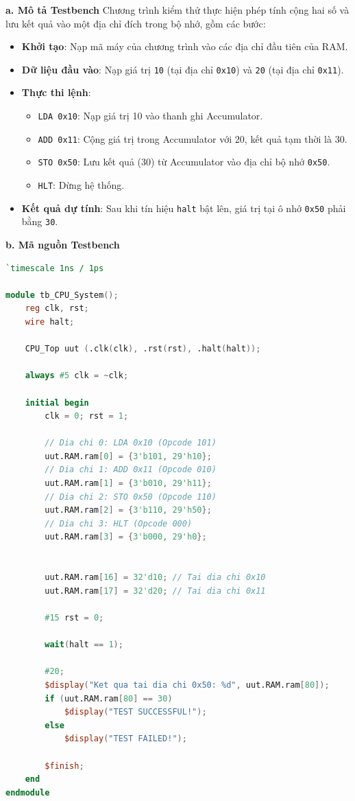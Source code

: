 
\textbf{a. Mô tả Testbench} 
Chương trình kiểm thử thực hiện phép tính cộng hai số và lưu kết quả vào một địa chỉ đích trong bộ nhớ, gồm các bước:
\begin{itemize}
    \item \textbf{Khởi tạo}: Nạp mã máy của chương trình vào các địa chỉ đầu tiên của RAM.
    \item \textbf{Dữ liệu đầu vào}: Nạp giá trị \texttt{10} (tại địa chỉ \texttt{0x10}) và \texttt{20} (tại địa chỉ \texttt{0x11}).
    \item \textbf{Thực thi lệnh}: 
    \begin{itemize}
        \item \texttt{LDA 0x10}: Nạp giá trị 10 vào thanh ghi Accumulator.
        \item \texttt{ADD 0x11}: Cộng giá trị trong Accumulator với 20, kết quả tạm thời là 30.
        \item \texttt{STO 0x50}: Lưu kết quả (30) từ Accumulator vào địa chỉ bộ nhớ \texttt{0x50}.
        \item \texttt{HLT}: Dừng hệ thống.
    \end{itemize}
    \item \textbf{Kết quả dự tính}: Sau khi tín hiệu \texttt{halt} bật lên, giá trị tại ô nhớ \texttt{0x50} phải bằng \texttt{30}.
\end{itemize}

\textbf{b. Mã nguồn Testbench}

\begin{lstlisting}[language=Verilog, caption={Testbench CPU}]
`timescale 1ns / 1ps

module tb_CPU_System();
    reg clk, rst;
    wire halt;

    CPU_Top uut (.clk(clk), .rst(rst), .halt(halt));

    always #5 clk = ~clk;

    initial begin
        clk = 0; rst = 1;
        
        // Dia chi 0: LDA 0x10 (Opcode 101)
        uut.RAM.ram[0] = {3'b101, 29'h10}; 
        // Dia chi 1: ADD 0x11 (Opcode 010)
        uut.RAM.ram[1] = {3'b010, 29'h11};
        // Dia chi 2: STO 0x50 (Opcode 110)
        uut.RAM.ram[2] = {3'b110, 29'h50};
        // Dia chi 3: HLT (Opcode 000)
        uut.RAM.ram[3] = {3'b000, 29'h0};


        uut.RAM.ram[16] = 32'd10; // Tai dia chi 0x10
        uut.RAM.ram[17] = 32'd20; // Tai dia chi 0x11

        #15 rst = 0;

        wait(halt == 1);
        
        #20;
        $display("Ket qua tai dia chi 0x50: %d", uut.RAM.ram[80]);
        if (uut.RAM.ram[80] == 30) 
            $display("TEST SUCCESSFUL!");
        else 
            $display("TEST FAILED!");
            
        $finish;
    end
endmodule
\end{lstlisting}

